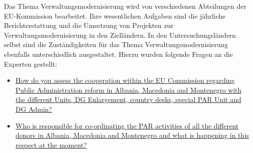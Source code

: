 Das Thema Verwaltungsmodernisierung wird von verschiedenen Abteilungen der EU-Kommission bearbeitet. Ihre wesentlichen Aufgaben sind die jährliche Berichterstattung und die Umsetzung von Projekten zur Verwaltungsmodernisierung in den Zielländern. In den Untersuchungsländern selbst sind die Zuständigkeiten für das Thema Verwaltungsmodernisierung ebenfalls unterschiedlich ausgestaltet. Hierzu wurden folgende Fragen an die Experten gestellt:
\begin{itemize}[label={}]
\item \ul{How do you assess the cooperation within the EU Commission regarding Public Administration reform in Albania, Macedonia and Montenegro with the different Units, DG Enlargement, country desks, special PAR Unit and DG Admin?}
\item \ul{Who is responsible for co-ordinating the PAR activities of all the different donors in Albania, Macedonia and Montenegro and what is happening in this respect at the moment? }
\end{itemize}

